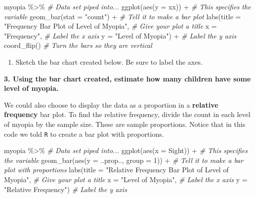 \documentclass[
]{report}
\newenvironment{Shaded}{\begin{snugshade}}{\end{snugshade}}
\newcommand{\AttributeTok}[1]{\textcolor[rgb]{0.77,0.63,0.00}{#1}}
\newcommand{\CommentTok}[1]{\textcolor[rgb]{0.56,0.35,0.01}{\textit{#1}}}
\newcommand{\DecValTok}[1]{\textcolor[rgb]{0.00,0.00,0.81}{#1}}
\newcommand{\FunctionTok}[1]{\textcolor[rgb]{0.00,0.00,0.00}{#1}}
\newcommand{\NormalTok}[1]{#1}
\newcommand{\SpecialCharTok}[1]{\textcolor[rgb]{0.00,0.00,0.00}{#1}}
\newcommand{\StringTok}[1]{\textcolor[rgb]{0.31,0.60,0.02}{#1}}
\providecommand{\tightlist}{%
  \setlength{\itemsep}{0pt}\setlength{\parskip}{0pt}}
\begin{document}
\begin{Shaded}
\begin{Highlighting}[]
\NormalTok{myopia }\SpecialCharTok{\%\textgreater{}\%} \CommentTok{\# Data set piped into...}
\FunctionTok{ggplot}\NormalTok{(}\FunctionTok{aes}\NormalTok{(}\AttributeTok{y =}\NormalTok{ xx)) }\SpecialCharTok{+}   \CommentTok{\# This specifies the variable}
  \FunctionTok{geom\_bar}\NormalTok{(}\AttributeTok{stat =} \StringTok{"count"}\NormalTok{) }\SpecialCharTok{+}  \CommentTok{\# Tell it to make a bar plot}
  \FunctionTok{labs}\NormalTok{(}\AttributeTok{title =} \StringTok{"Frequency Bar Plot of Level of Myopia"}\NormalTok{,  }\CommentTok{\# Give your plot a title}
       \AttributeTok{x =} \StringTok{"Frequency"}\NormalTok{,   }\CommentTok{\# Label the x axis}
       \AttributeTok{y =} \StringTok{"Level of Myopia"}\NormalTok{)  }\SpecialCharTok{+} \CommentTok{\# Label the y axis}
  \FunctionTok{coord\_flip}\NormalTok{()  }\CommentTok{\# Turn the bars so they are vertical}
\end{Highlighting}
\end{Shaded}

\begin{enumerate}
\def\labelenumi{\arabic{enumi}.}
\setcounter{enumi}{1}
\tightlist
\item
  Sketch the bar chart created below. Be sure to label the axes.
\end{enumerate}

\vspace{2in}

\textbf{3. Using the bar chart created, estimate how many children have some level of myopia.}

\vspace{0.3in}

We could also choose to display the data as a proportion in a \textbf{relative frequency} bar plot. To find the relative frequency, divide the count in each level of myopia by the sample size. These are sample proportions. Notice that in this code we told \texttt{R} to create a bar plot with proportions.

\begin{Shaded}
\begin{Highlighting}[]
\NormalTok{myopia }\SpecialCharTok{\%\textgreater{}\%} \CommentTok{\# Data set piped into...}
\FunctionTok{ggplot}\NormalTok{(}\FunctionTok{aes}\NormalTok{(}\AttributeTok{x =}\NormalTok{ Sight)) }\SpecialCharTok{+}   \CommentTok{\# This specifies the variable}
  \FunctionTok{geom\_bar}\NormalTok{(}\FunctionTok{aes}\NormalTok{(}\AttributeTok{y =}\NormalTok{ ..prop.., }\AttributeTok{group =} \DecValTok{1}\NormalTok{)) }\SpecialCharTok{+}  \CommentTok{\# Tell it to make a bar plot with proportions}
  \FunctionTok{labs}\NormalTok{(}\AttributeTok{title =} \StringTok{"Relative Frequency Bar Plot of Level of Myopia"}\NormalTok{,  }\CommentTok{\# Give your plot a title}
       \AttributeTok{x =} \StringTok{"Level of Myopia"}\NormalTok{,   }\CommentTok{\# Label the x axis}
       \AttributeTok{y =} \StringTok{"Relative Frequency"}\NormalTok{)  }\CommentTok{\# Label the y axis}
\end{Highlighting}
\end{Shaded}
\end{document}
